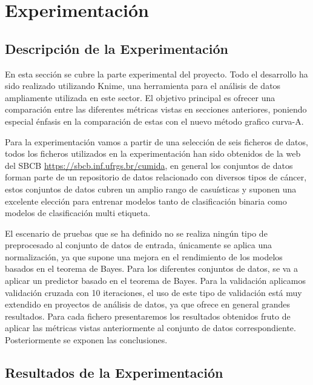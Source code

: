 \section{Experimentación}

\subsection{Descripción de la Experimentación}

En esta sección se cubre la parte experimental del proyecto. Todo el desarrollo ha sido realizado utilizando Knime, una herramienta para el análisis de datos ampliamente utilizada en este sector. El objetivo principal es ofrecer una comparación entre las diferentes métricas vistas en secciones anteriores, poniendo especial énfasis en la comparación de estas con el nuevo método grafico curva-A.

\bigbreak

Para la experimentación vamos a partir de una selección de seis ficheros de datos, todos los ficheros utilizados en la experimentación han sido obtenidos de la web del SBCB \url{https://sbcb.inf.ufrgs.br/cumida}, en general los conjuntos de datos forman parte de un repositorio de datos relacionado con diversos tipos de cáncer, estos conjuntos de datos cubren un amplio rango de casuísticas y suponen una excelente elección para entrenar modelos tanto de clasificación binaria como modelos de clasificación multi etiqueta.

\bigbreak

El escenario de pruebas que se ha definido no se realiza ningún tipo de preprocesado al conjunto de datos de entrada, únicamente se aplica una normalización, ya que supone una mejora en el rendimiento de los modelos basados en el teorema de Bayes. Para los diferentes conjuntos de datos, se va a aplicar un predictor basado en el teorema de Bayes. Para la validación aplicamos validación cruzada con 10 iteraciones, el uso de este tipo de validación está muy extendido en proyectos de análisis de datos, ya que ofrece en general grandes resultados. Para cada fichero presentaremos los resultados obtenidos fruto de aplicar las métricas vistas anteriormente al conjunto de datos correspondiente. Posteriormente se exponen las conclusiones.


\clearpage

\subsection{Resultados de la Experimentación}


